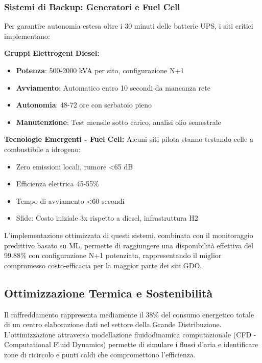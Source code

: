 \subsubsection{\texorpdfstring{\textbf{Sistemi di Backup: Generatori e Fuel Cell}}{3.2.1.4 - Sistemi di Backup: Generatori e Fuel Cell}}

Per garantire autonomia estesa oltre i 30 minuti delle batterie UPS, i siti critici implementano:

\textbf{Gruppi Elettrogeni Diesel:}
\begin{itemize}
    \item \textbf{Potenza}: 500-2000 kVA per sito, configurazione N+1
    \item \textbf{Avviamento}: Automatico entro 10 secondi da mancanza rete
    \item \textbf{Autonomia}: 48-72 ore con serbatoio pieno
    \item \textbf{Manutenzione}: Test mensile sotto carico, analisi olio semestrale
\end{itemize}

\textbf{Tecnologie Emergenti - Fuel Cell:}
Alcuni siti pilota stanno testando celle a combustibile a idrogeno:
\begin{itemize}
    \item Zero emissioni locali, rumore <65 dB
    \item Efficienza elettrica 45-55\%
    \item Tempo di avviamento <60 secondi
    \item Sfide: Costo iniziale 3x rispetto a diesel, infrastruttura H2
\end{itemize}

L'implementazione ottimizzata di questi sistemi, combinata con il monitoraggio predittivo basato su ML, permette di raggiungere una disponibilità effettiva del 99.88\% con configurazione N+1 potenziata, rappresentando il miglior compromesso costo-efficacia per la maggior parte dei siti GDO.
\subsection{\texorpdfstring{\textbf{Ottimizzazione Termica e Sostenibilità}}{3.2.2 - Ottimizzazione Termica e Sostenibilità}}

Il raffreddamento rappresenta mediamente il 38\% del consumo energetico totale di un centro elaborazione dati nel settore della Grande Distribuzione\autocite{ASHRAE2024}. L'ottimizzazione attraverso modellazione fluidodinamica computazionale (CFD - Computational Fluid Dynamics) permette di simulare i flussi d'aria e identificare zone di ricircolo e punti caldi che compromettono l'efficienza.


